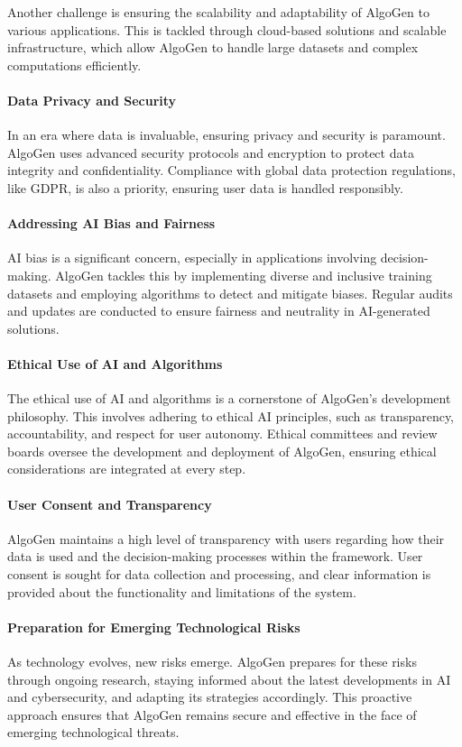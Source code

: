\documentclass{article}
\begin{document}
Another challenge is ensuring the scalability and adaptability of AlgoGen to various applications. This is tackled through cloud-based solutions and scalable infrastructure, which allow AlgoGen to handle large datasets and complex computations efficiently.

\paragraph{Data Privacy and Security}
In an era where data is invaluable, ensuring privacy and security is paramount. AlgoGen uses advanced security protocols and encryption to protect data integrity and confidentiality. Compliance with global data protection regulations, like GDPR, is also a priority, ensuring user data is handled responsibly.

\paragraph{Addressing AI Bias and Fairness}
AI bias is a significant concern, especially in applications involving decision-making. AlgoGen tackles this by implementing diverse and inclusive training datasets and employing algorithms to detect and mitigate biases. Regular audits and updates are conducted to ensure fairness and neutrality in AI-generated solutions.

\paragraph{Ethical Use of AI and Algorithms}
The ethical use of AI and algorithms is a cornerstone of AlgoGen's development philosophy. This involves adhering to ethical AI principles, such as transparency, accountability, and respect for user autonomy. Ethical committees and review boards oversee the development and deployment of AlgoGen, ensuring ethical considerations are integrated at every step.

\paragraph{User Consent and Transparency}
AlgoGen maintains a high level of transparency with users regarding how their data is used and the decision-making processes within the framework. User consent is sought for data collection and processing, and clear information is provided about the functionality and limitations of the system.

\paragraph{Preparation for Emerging Technological Risks}
As technology evolves, new risks emerge. AlgoGen prepares for these risks through ongoing research, staying informed about the latest developments in AI and cybersecurity, and adapting its strategies accordingly. This proactive approach ensures that AlgoGen remains secure and effective in the face of emerging technological threats.
\end{document}
